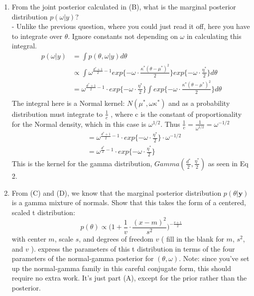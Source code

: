 \documentclass{homework}
\begin{document}
\begin{enumerate}[label=(\Alph*)]
\item  From the joint posterior calculated in (B), what is the marginal posterior distribution $p(\omega | y)$? \\ 
- Unlike the previous question, where you could just read it off, here you have to integrate over $\theta$. Ignore constants not depending on $\omega$ in calculating this integral.
\begin{equation} \begin{split}
p(\omega | y) & = \int p(\theta,\omega | y) d\theta \\
& \propto \int \omega^{\frac{d^*+1}{2} - 1}exp\{ -\omega \cdot \frac{\kappa^*(\theta - \mu^*)^2}{2}\}exp\{-\omega \cdot \frac{\eta^*}{2}\} d\theta \\
& =   \omega^{\frac{d^*+1}{2} - 1} \cdot exp\{-\omega \cdot \frac{\eta^*}{2}\} \int exp\{ -\omega \cdot \frac{\kappa^*(\theta - \mu^*)^2}{2}\} d\theta \\
\end{split} \end{equation}
The integral here is a Normal kernel: $N (\mu^*, \omega\kappa^*)$ and as a probability distribution must integrate to $\frac{1}{c}$ , where c is the constant of proportionality for the Normal density, which in this case is $\omega^{1/2}$.  Thus $\frac{1}{c} = \frac{1}{\omega^{1/2}} = \omega^{-1/2}$ 
\begin{equation} \begin{split}
& = \omega^{\frac{d^*+1}{2} - 1} \cdot exp\{-\omega \cdot \frac{\eta^*}{2}\}  \cdot \omega^{-1/2} \\
& = \omega^{\frac{d^*}{2} - 1} \cdot exp\{-\omega \cdot \frac{\eta^*}{2}\}  
\end{split} \end{equation}
This is the kernel for the gamma distribution, $Gamma(\frac{d^*}{2} , \frac{\eta^*}{2})$ as seen in Eq 2.

\item From (C) and (D), we know that the marginal posterior distribution $p(\theta | \textbf{y})$ is a gamma mixture of normals. Show that this takes the form of a centered, scaled t distribution:
$$p(\theta) \propto \big( 1 + \frac{1}{v} \cdot \frac{(x-m)^2}{s^2}\big)^{-\frac{v+1}{2}}$$
with center $m$, scale $s$, and degrees of freedom $v$ ( fill in the blank for $m$, $s^2$, and $v$ ). 
express the parameters of this t distribution in terms of the four parameters of the normal-gamma posterior for $(\theta, \omega)$. Note: since you've set up the normal-gamma family in this careful conjugate form, this should require no extra work. It's just part (A), except for the prior rather than the posterior.


\end{enumerate}
\end{document}
